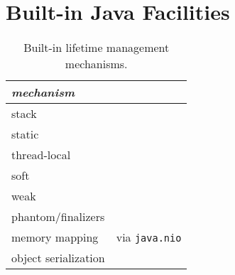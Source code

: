 \chapter{Built-in Java Facilities}


\begin{table}
\centering
\begin{tabular}{|l|l|} \hline
\em mechanism & \\ \hline \hline
stack & \\ \hline 
static & \\ \hline
thread-local & \\ \hline
soft & \\ \hline
weak & \\ \hline
phantom/finalizers & \\ \hline
memory mapping & via \texttt{java.nio} \\ \hline 
object serialization & \\ \hline
\end{tabular}
\caption{Built-in lifetime management mechanisms.}
\label{tab:builtin-lifetime-management}
\end{table}
